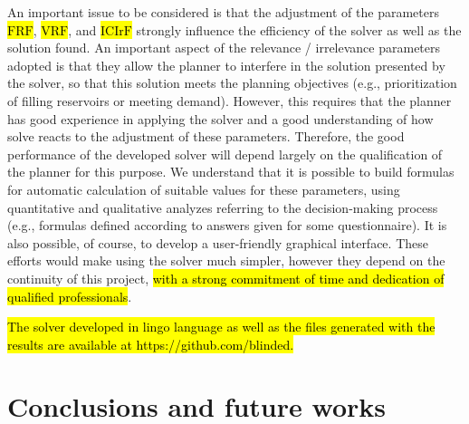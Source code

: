 \documentclass{singlecol}
\theoremstyle{TH}{
\newtheorem{lemma}{Lemma}
\newtheorem{theorem}[lemma]{Theorem}
\newtheorem{corrolary}[lemma]{Corrolary}
\newtheorem{conjecture}[lemma]{Conjecture}
\newtheorem{proposition}[lemma]{Proposition}
\newtheorem{claim}[lemma]{Claim}
\newtheorem{stheorem}[lemma]{Wrong Theorem}
\newtheorem{algorithm}{Algorithm}
}
\theoremstyle{THrm}{
\newtheorem{definition}{Definition}[section]
\newtheorem{question}{Question}[section]
\newtheorem{remark}{Remark}
\newtheorem{scheme}{Scheme}
}
\theoremstyle{THhit}{
\newtheorem{case}{Case}[section]
}
\begin{document}
An important issue to be considered is that the adjustment of the parameters \hl{$\mathrm{FRF}$}, \hl{$\mathrm{VRF}$}, and \hl{$\mathrm{ICIrF}$} strongly influence the efficiency of the solver as well as the solution found. An important aspect of the relevance / irrelevance parameters adopted is that they allow the planner to interfere in the solution presented by the solver, so that this solution meets the planning objectives (e.g., prioritization of filling reservoirs or meeting demand). However, this requires that the planner has good experience in applying the solver and a good understanding of how solve reacts to the adjustment of these parameters. Therefore, the good performance of the developed solver will depend largely on the qualification of the planner for this purpose. We understand that it is possible to build formulas for automatic calculation of suitable values for these parameters, using quantitative and qualitative analyzes referring to the decision-making process (e.g., formulas defined according to answers given for some questionnaire). It is also possible, of course, to develop a user-friendly graphical interface. These efforts would make using the solver much simpler, however they depend on the continuity of this project, \hl{with a strong commitment of time and dedication of qualified professionals}.

\hl{The solver developed in lingo language as well as the files generated with the results are available at https://github.com/blinded.}

\section{Conclusions and future works}
\label{sec:conclusions}
\end{document}
